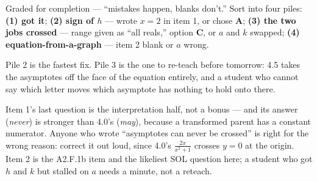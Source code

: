 \documentclass[10pt]{article}
\begin{document}
\begin{teachernote}
Graded for completion --- ``mistakes happen, blanks don't.'' Sort into four piles: \textbf{(1) got it};
\textbf{(2) sign of $h$} --- wrote $x=2$ in item 1, or chose \textbf{A}; \textbf{(3) the two jobs
crossed} --- range given as ``all reals,'' option \textbf{C}, or $a$ and $k$ swapped; \textbf{(4)
equation-from-a-graph} --- item 2 blank or $a$ wrong.

\vspace{3pt}
Pile 2 is the fastest fix. Pile 3 is the one to re-teach before tomorrow: 4.5 takes the asymptotes off
the face of the equation entirely, and a student who cannot say which letter moves which asymptote has
nothing to hold onto there.

\vspace{3pt}
Item 1's last question is the interpretation half, not a bonus --- and its answer (\emph{never}) is
stronger than 4.0's (\emph{may}), because a transformed parent has a constant numerator. Anyone who
wrote ``asymptotes can never be crossed'' is right for the wrong reason: correct it out loud, since
4.0's $\frac{2x}{x^2+1}$ crosses $y=0$ at the origin. Item 2 is the A2.F.1b item and the likeliest SOL
question here; a student who got $h$ and $k$ but stalled on $a$ needs a minute, not a reteach.
\end{teachernote}
\end{document}
